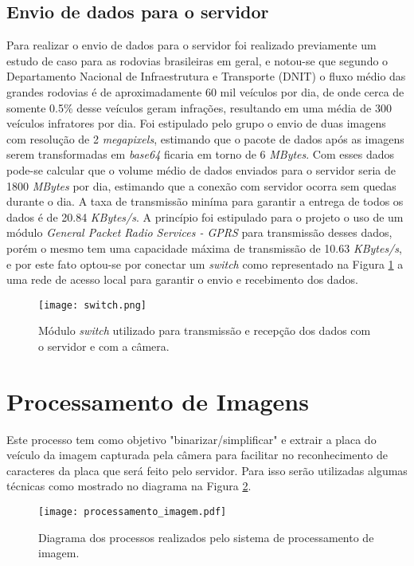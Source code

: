     \subsection{Envio de dados para o servidor}
    Para realizar o envio de dados para o servidor foi realizado previamente um estudo de caso para as rodovias brasileiras em geral, e notou-se que segundo o Departamento Nacional de Infraestrutura e Transporte (DNIT) o fluxo médio das grandes rodovias é de aproximadamente 60 mil veículos por dia, de onde cerca de somente 0.5\% desse veículos geram infrações, resultando em uma média de 300 veículos infratores por dia. Foi estipulado pelo grupo o envio de duas imagens com resolução de 2 \emph{megapixels}, estimando que o pacote de dados após as imagens serem transformadas em \emph{base64} ficaria em torno de 6 \emph{MBytes}. Com esses dados pode-se calcular que o volume médio de dados enviados para o servidor seria de 1800 \emph{MBytes} por dia, estimando que a conexão com servidor ocorra sem quedas durante o dia. A taxa de transmissão miníma para garantir a entrega de todos os dados é de 20.84 \emph{KBytes/s}. A princípio foi estipulado para o projeto o uso de um módulo \emph{General Packet Radio Services - GPRS} para transmissão desses dados, porém o mesmo tem uma capacidade máxima de transmissão de 10.63 \emph{KBytes/s}, e por este fato optou-se por conectar um \emph{switch}  como representado na Figura \ref{switch} a uma rede de acesso local para garantir o envio e recebimento dos dados. %
        \begin{figure}[H]
            \centering
            \texttt{[image: switch.png]}
            \caption{Módulo \emph{switch} utilizado para transmissão e recepção dos dados com o servidor e com a câmera.}
            \label{switch}
        \end{figure}

\section{Processamento de Imagens}

Este processo tem como objetivo "binarizar/simplificar" e extrair a placa do veículo da imagem capturada pela câmera para facilitar no reconhecimento de caracteres da placa que será feito pelo servidor. Para isso serão utilizadas algumas técnicas como mostrado no diagrama na Figura \ref{processamento}.


\begin{figure}[H]
    \centering
    \texttt{[image: processamento\_imagem.pdf]}
    \caption{Diagrama dos processos realizados pelo sistema de processamento de imagem.}
    \label{processamento}
\end{figure}

